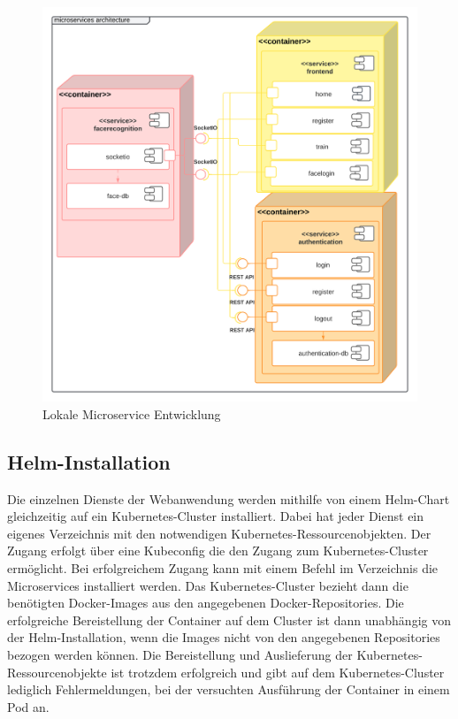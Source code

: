 \begin{figure}[!htb]
    \centering
    \includegraphics[width=1.0\columnwidth]{images/UML-Microservices-Diagramm.png}
    \caption{Lokale Microservice Entwicklung}
    \label{fig:UML-Microservices}
\end{figure}




\subsection{Helm-Installation}

Die einzelnen Dienste der Webanwendung werden mithilfe von einem Helm-Chart gleichzeitig auf ein Kubernetes-Cluster installiert.
Dabei hat jeder Dienst ein eigenes Verzeichnis mit den notwendigen Kubernetes-Ressourcenobjekten.
Der Zugang erfolgt über eine Kubeconfig die den Zugang zum Kubernetes-Cluster ermöglicht.
Bei erfolgreichem Zugang kann mit einem Befehl im Verzeichnis die Microservices installiert werden.
Das Kubernetes-Cluster bezieht dann die benötigten Docker-Images aus den angegebenen Docker-Repositories.
Die erfolgreiche Bereistellung der Container auf dem Cluster ist dann unabhängig von der Helm-Installation, wenn die Images nicht von den angegebenen Repositories bezogen werden können. 
Die Bereistellung und Auslieferung der Kubernetes-Ressourcenobjekte ist trotzdem erfolgreich und gibt auf dem Kubernetes-Cluster lediglich Fehlermeldungen, bei der versuchten Ausführung der Container in einem Pod an.

